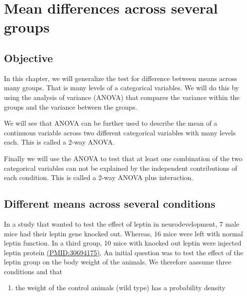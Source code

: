 \documentclass[
]{book}
\providecommand{\tightlist}{%
  \setlength{\itemsep}{0pt}\setlength{\parskip}{0pt}}
\begin{document}
\hypertarget{mean-differences-across-several-groups}{%
\chapter{Mean differences across several groups}\label{mean-differences-across-several-groups}}

\hypertarget{objective-12}{%
\section{Objective}\label{objective-12}}

In this chapter, we will generalize the test for difference between means across many groups. That is many levels of a categorical variables. We will do this by using the analysis of variance (ANOVA) that compares the variance within the groups and the variance between the groups.

We will see that ANOVA can be further used to describe the mean of a continuous variable across two different categorical variables with many levels each. This is called a 2-way ANOVA.

Finally we will use the ANOVA to test that at least one combination of the two categorical variables can not be explained by the independent contributions of each condition. This is called a 2-way ANOVA plus interaction.

\hypertarget{different-means-across-several-conditions}{%
\section{Different means across several conditions}\label{different-means-across-several-conditions}}

In a study that wanted to test the effect of leptin in neurodevelopment, 7 male mice had their leptin gene knocked out. Whereas, 16 mice were left with normal leptin function. In a third group, 10 mice with knocked out leptin were injected leptin protein \href{https://pubmed.ncbi.nlm.nih.gov/30694175/}{(PMID:30694175)}. An initial question was to test the effect of the leptin group on the body weight of the animals. We therefore aassume three conditions and that

\begin{enumerate}
\def\labelenumi{\arabic{enumi}.}
\tightlist
\item
  the weight of the control animals (wild type) has a probability density
\end{enumerate}
\end{document}
